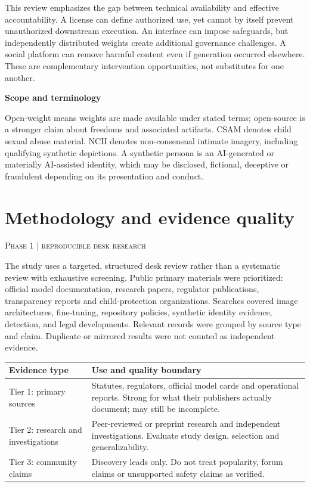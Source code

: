 \documentclass[11pt,a4paper]{article}
\newcommand{\sect}[2]{\section{#1}\textcolor{muted}{\small\textsc{#2}}\par\vspace{2mm}}
\newcommand{\sub}[1]{\vspace{1mm}\textbf{#1}\par}
\begin{document}
This review emphasizes the gap between technical availability and effective accountability. A license can define authorized use, yet cannot by itself prevent unauthorized downstream execution. An interface can impose safeguards, but independently distributed weights create additional governance challenges. A social platform can remove harmful content even if generation occurred elsewhere. These are complementary intervention opportunities, not substitutes for one another.


\sub{Scope and terminology}

Open-weight means weights are made available under stated terms; open-source is a stronger claim about freedoms and associated artifacts. CSAM denotes child sexual abuse material. NCII denotes non-consensual intimate imagery, including qualifying synthetic depictions. A synthetic persona is an AI-generated or materially AI-assisted identity, which may be disclosed, fictional, deceptive or fraudulent depending on its presentation and conduct.


\clearpage\sect{Methodology and evidence quality}{Phase 1 | reproducible desk research}

The study uses a targeted, structured desk review rather than a systematic review with exhaustive screening. Public primary materials were prioritized: official model documentation, research papers, regulator publications, transparency reports and child-protection organizations. Searches covered image architectures, fine-tuning, repository policies, synthetic identity evidence, detection, and legal developments. Relevant records were grouped by source type and claim. Duplicate or mirrored results were not counted as independent evidence.


\begin{center}\small\begin{tabularx}{\linewidth}{@{}YY@{}}\toprule
\textbf{Evidence type} & \textbf{Use and quality boundary}\\\midrule
Tier 1: primary sources & Statutes, regulators, official model cards and operational reports. Strong for what their publishers actually document; may still be incomplete.\\
Tier 2: research and investigations & Peer-reviewed or preprint research and independent investigations. Evaluate study design, selection and generalizability.\\
Tier 3: community claims & Discovery leads only. Do not treat popularity, forum claims or unsupported safety claims as verified.\\\bottomrule\end{tabularx}\end{center}
\end{document}
